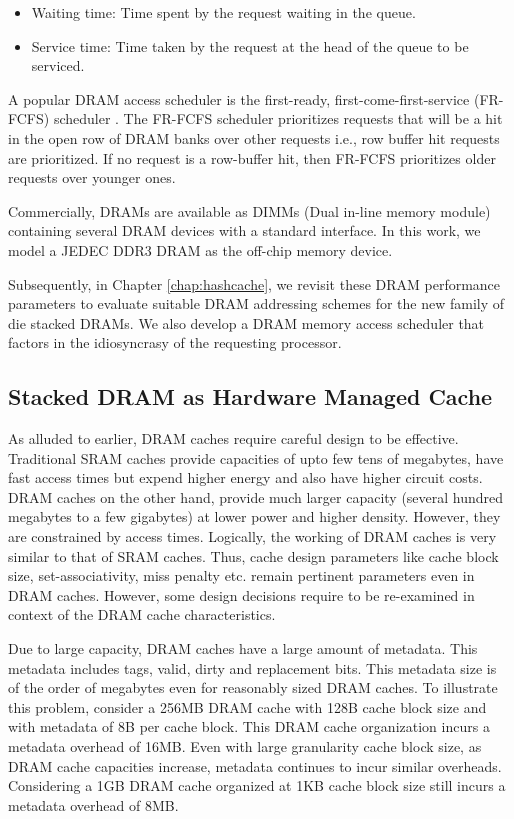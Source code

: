 \begin{itemize}
	\item Waiting time: Time spent by the request waiting in the queue.
	\item Service time: Time taken by the request at the head of the queue to be serviced.
\end{itemize}
A popular DRAM access scheduler is the first-ready, first-come-first-service (FR-FCFS) scheduler \cite{frfcfs}. The FR-FCFS scheduler prioritizes requests that will be a hit in the open row of DRAM banks over other requests i.e., row buffer hit requests are prioritized. If no request is a row-buffer hit, then FR-FCFS prioritizes older requests over younger ones.

\par Commercially, DRAMs are available as DIMMs (Dual in-line memory module) containing several DRAM devices with a standard interface. In this work, we model a JEDEC DDR3 DRAM \cite{jedec-ddr3} as the off-chip memory device.
\par Subsequently, in Chapter \ref{chap:hashcache}, we revisit these DRAM performance parameters to evaluate suitable DRAM addressing schemes for the new family of die stacked DRAMs. We also develop a DRAM memory access scheduler that factors in the idiosyncrasy of the requesting processor.

\subsection{Stacked DRAM as Hardware Managed Cache} \label{dramcache-background}
As alluded to earlier, DRAM caches require careful design to be effective. Traditional SRAM caches provide capacities of upto few tens of megabytes, have fast access times but expend higher energy and also have higher circuit costs. DRAM caches on the other hand, provide much larger capacity (several hundred megabytes to a few gigabytes) at lower power and higher density. However, they are constrained by access times. 
Logically, the working of DRAM caches is very similar to that of SRAM caches. Thus, cache design parameters like cache block size, set-associativity, miss penalty etc. remain pertinent parameters even in DRAM caches.
However, some design decisions require to be re-examined in context of the DRAM cache characteristics.
\par Due to large capacity, DRAM caches have a large amount of metadata. This metadata includes tags, valid, dirty and replacement bits. This metadata size is of the order of megabytes even for reasonably sized DRAM caches. To illustrate this problem, consider a 256MB DRAM cache with 128B cache block size and with metadata of 8B per cache block. This DRAM cache organization incurs a metadata overhead of 16MB. Even with large granularity cache block size, as DRAM cache capacities increase, metadata continues to incur similar overheads. Considering a 1GB DRAM cache organized at 1KB cache block size still incurs a metadata overhead of 8MB.
